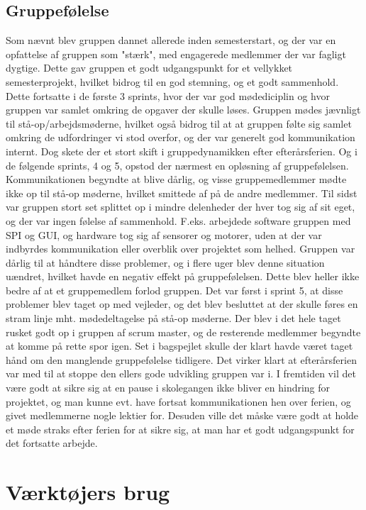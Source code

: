 \subsection{Gruppefølelse}
Som nævnt blev gruppen dannet allerede inden semesterstart, og der var en opfattelse af gruppen som "stærk", med engagerede medlemmer der var fagligt dygtige.
Dette gav gruppen et godt udgangspunkt for et vellykket semesterprojekt, hvilket bidrog til en god stemning, og et godt sammenhold. Dette fortsatte i de første
3 sprints, hvor der var god mødediciplin og hvor gruppen var samlet omkring de opgaver der skulle løses. Gruppen mødes jævnligt til stå-op/arbejdsmøderne,
hvilket også bidrog til at at gruppen følte sig samlet omkring de udfordringer vi stod overfor, og der var generelt god kommunikation internt. Dog skete der et 
stort skift i gruppedynamikken efter efterårsferien. Og i de følgende sprints, 4 og 5, opstod der nærmest en opløsning af gruppefølelsen. Kommunikationen begyndte 
at blive dårlig, og visse gruppemedlemmer mødte ikke op til stå-op møderne, hvilket smittede af på de andre medlemmer. Til sidst var gruppen stort set splittet
op i mindre delenheder der hver tog sig af sit eget, og der var ingen følelse af sammenhold. F.eks. arbejdede software gruppen med SPI og GUI, og hardware 
tog sig af sensorer og motorer, uden at der var indbyrdes kommunikation eller overblik over projektet som helhed. Gruppen var dårlig til at håndtere disse 
problemer, og i flere uger blev denne situation uændret, hvilket havde en negativ effekt på gruppefølelsen. Dette blev heller ikke bedre af at et gruppemedlem 
forlod gruppen. Det var først i sprint 5, at disse problemer blev taget op med vejleder, og det blev besluttet at der skulle føres en stram linje mht. mødedeltagelse
på stå-op møderne. Der blev i det hele taget rusket godt op i gruppen af scrum master, og de resterende medlemmer begyndte at komme på rette spor igen. Set i bagspejlet
skulle der klart havde været taget hånd om den manglende gruppefølelse tidligere. Det virker klart at efterårsferien var med til at stoppe den ellers
gode udvikling gruppen var i. I fremtiden vil det være godt at sikre sig at en pause i skolegangen ikke bliver en hindring for projektet, og man kunne evt. 
have fortsat kommunikationen hen over ferien, og givet medlemmerne nogle lektier for. Desuden ville det måske være godt at holde et møde straks efter ferien
for at sikre sig, at man har et godt udgangspunkt for det fortsatte arbejde.  

\section{Værktøjers brug}
